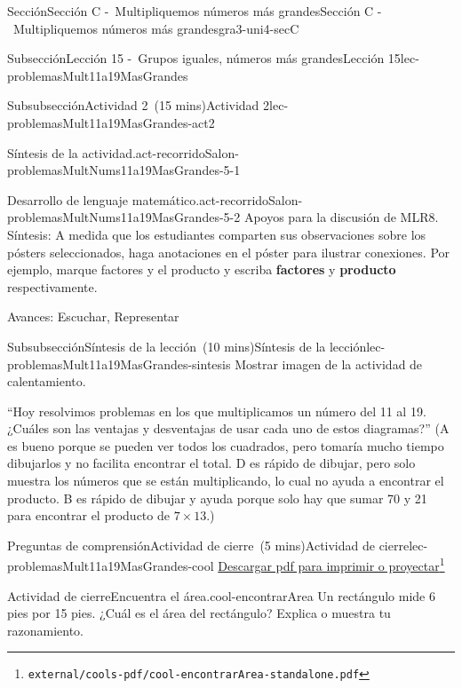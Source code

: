 \documentclass[oneside,10pt,]{article}
\newcommand{\terminology}[1]{\textbf{#1}}
\begin{document}
\begin{sectionptx}{Sección}{Sección C -~Multipliquemos números más grandes}{}{Sección C -~Multipliquemos números más grandes}{}{}{gra3-uni4-secC}
\begin{subsectionptx}{Subsección}{Lección 15 -~Grupos iguales, números más grandes}{}{Lección 15}{}{}{lec-problemasMult11a19MasGrandes}
\begin{subsubsectionptx}{Subsubsección}{Actividad 2~(15 mins)}{}{Actividad 2}{}{}{lec-problemasMult11a19MasGrandes-act2}
\begin{paragraphs}{Síntesis de la actividad.}{act-recorridoSalon-problemasMultNums11a19MasGrandes-5-1}
\begin{image}{0}{1}{0}{}
\end{image}%
\end{paragraphs}%
\begin{paragraphs}{Desarrollo de lenguaje matemático.}{act-recorridoSalon-problemasMultNums11a19MasGrandes-5-2}%
Apoyos para la discusión de MLR8. Síntesis: A medida que los estudiantes comparten sus observaciones sobre los pósters seleccionados, haga anotaciones en el póster para ilustrar conexiones. Por ejemplo, marque factores y el producto y escriba \terminology{factores} y \terminology{producto} respectivamente.%
\par
Avances: Escuchar, Representar%
\end{paragraphs}%
\end{subsubsectionptx}
%
%
\typeout{************************************************}
\typeout{************************************************}
%
\begin{subsubsectionptx}{Subsubsección}{Síntesis de la lección~(10 mins)}{}{Síntesis de la lección}{}{}{lec-problemasMult11a19MasGrandes-sintesis}
Mostrar imagen de la actividad de calentamiento.%
\par
``Hoy resolvimos problemas en los que multiplicamos un número del 11 al 19. ¿Cuáles son las ventajas y desventajas de usar cada uno de estos diagramas?'' (A es bueno porque se pueden ver todos los cuadrados, pero tomaría mucho tiempo dibujarlos y no facilita encontrar el total. D es rápido de dibujar, pero solo muestra los números que se están multiplicando, lo cual no ayuda a encontrar el producto. B es rápido de dibujar y ayuda porque solo hay que sumar 70 y 21 para encontrar el producto de \(7 \times 13\).)%
\end{subsubsectionptx}
%
%
\typeout{************************************************}
\typeout{************************************************}
%
\begin{reading-questions-subsubsection}{Preguntas de comprensión}{Actividad de cierre~(5 mins)}{}{Actividad de cierre}{}{}{lec-problemasMult11a19MasGrandes-cool}
\href{external/cools-pdf/cool-encontrarArea-standalone.pdf}{Descargar pdf para imprimir o proyectar}\footnote{\nolinkurl{external/cools-pdf/cool-encontrarArea-standalone.pdf}\label{lec-problemasMult11a19MasGrandes-cool-5}}\begin{project}{Actividad de cierre}{Encuentra el área.}{cool-encontrarArea}%
Un rectángulo mide 6 pies por 15 pies. ¿Cuál es el área del rectángulo? Explica o muestra tu razonamiento.%

\end{project}
\end{reading-questions-subsubsection}
\end{subsectionptx}
\end{sectionptx}
\end{document}
